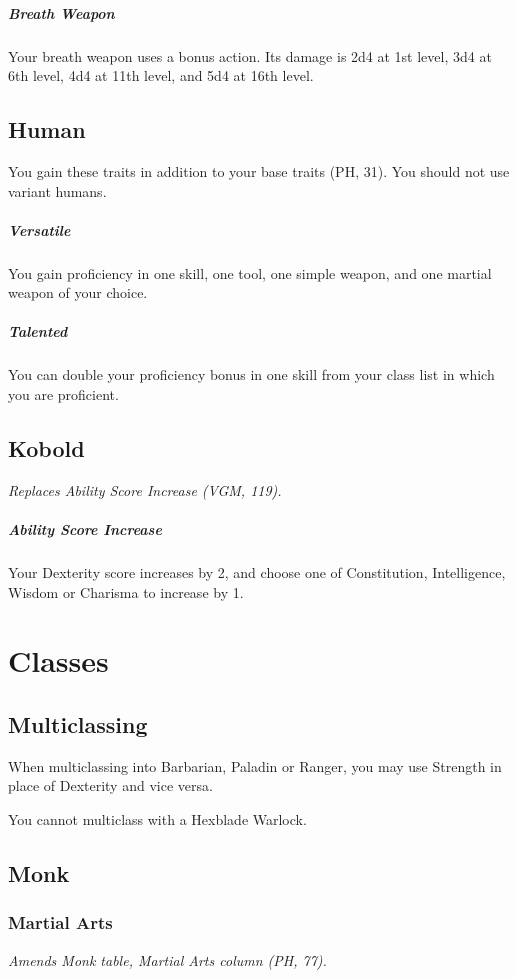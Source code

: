 \documentclass[House_Rules.tex]{subfiles}
\begin{document}
\subparagraph{Breath Weapon} Your breath weapon uses a bonus action. Its damage is 2d4 at 1st level, 3d4 at 6th level, 4d4 at 11th level, and 5d4 at 16th level.

\subsection{Human}

You gain these traits in addition to your base traits (PH, 31). You should not use variant humans.

\subparagraph{Versatile} You gain proficiency in one skill, one tool, one simple weapon, and one martial weapon of your choice.
\subparagraph{Talented} You can double your proficiency bonus in one skill from your class list in which you are proficient.

\subsection{Kobold}
\textit{Replaces Ability Score Increase (VGM, 119).}

\subparagraph{Ability Score Increase} Your Dexterity score increases by 2, and choose one of Constitution, Intelligence, Wisdom or Charisma to increase by 1.




\section{Classes}

\subsection{Multiclassing}
When multiclassing into Barbarian, Paladin or Ranger, you may use Strength in place of Dexterity and vice versa.

You cannot multiclass with a Hexblade Warlock.

\subsection{Monk}

\subsubsection{Martial Arts}
\textit{Amends Monk table, Martial Arts column (PH, 77).}
\end{document}
